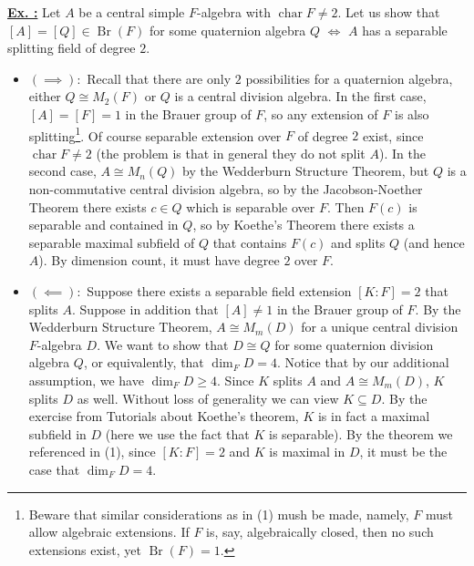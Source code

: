 \documentclass[a4paper, 12pt]{article}
\DeclareMathOperator{\chrs}{char}
\DeclareMathOperator{\Br}{Br}
\newcommand{\iso}{\cong}
\newcounter{excounter}[section]
\newenvironment{Exercise}
    {\refstepcounter{excounter}\underline{\textbf{Ex. \theexcounter:}}}
    {\par\vspace{\baselineskip}}
\begin{document}
\begin{Exercise}
    Let $A$ be a central simple $F$-algebra with $\chrs F \neq 2$.
    Let us show that $[A] = [Q] \in \Br(F)$ for some quaternion algebra $Q$ $\iff$ $A$ has a separable splitting field of degree $2$.
    \begin{itemize}
        \item \underline{$(\implies):$}
            Recall that there are only $2$ possibilities for a quaternion algebra, either $Q \iso M_2(F)$ or $Q$ is a central division algebra.
            In the first case, $[A] = [F] = 1$ in the Brauer group of $F$, so any extension of $F$ is also splitting\footnote{
            Beware that similar considerations as in (1) mush be made, namely, $F$ must allow algebraic extensions.
            If $F$ is, say, algebraically closed, then no such extensions exist, yet $\Br(F) = 1$.}.
            Of course separable extension over $F$ of degree $2$ exist, since $\chrs F \neq 2$ (the problem is that in general they do not split $A$).
            In the second case, $A \iso M_n(Q)$ by the Wedderburn Structure Theorem, but $Q$ is a non-commutative central division algebra, so by the Jacobson-Noether Theorem there exists $c \in Q$ which is separable over $F$.
            Then $F(c)$ is separable and contained in $Q$, so by Koethe's Theorem there exists a separable maximal subfield of $Q$ that contains $F(c)$ and splits $Q$ (and hence $A$).
            By dimension count, it must have degree $2$ over $F$.
        \item \underline{$(\impliedby):$}
            Suppose there exists a separable field extension $[K : F] = 2$ that splits $A$.
            Suppose in addition that $[A] \neq 1$ in the Brauer group of $F$.
            By the Wedderburn Structure Theorem, $A \iso M_m(D)$ for a unique central division $F$-algebra $D$.
            We want to show that $D \iso Q$ for some quaternion division algebra $Q$, or equivalently, that $\dim_F D = 4$.
            Notice that by our additional assumption, we have $\dim_F D \geq 4$.
            Since $K$ splits $A$ and $A \iso M_m(D)$, $K$ splits $D$ as well.
            Without loss of generality we can view $K \subseteq D$.
            By the exercise from Tutorials about Koethe's theorem, $K$ is in fact a maximal subfield in $D$ (here we use the fact that $K$ is separable).
            By the theorem we referenced in (1), since $[K : F] = 2$ and $K$ is maximal in $D$, it must be the case that $\dim_F D = 4$.
    \end{itemize}
\end{Exercise}
\end{document}
